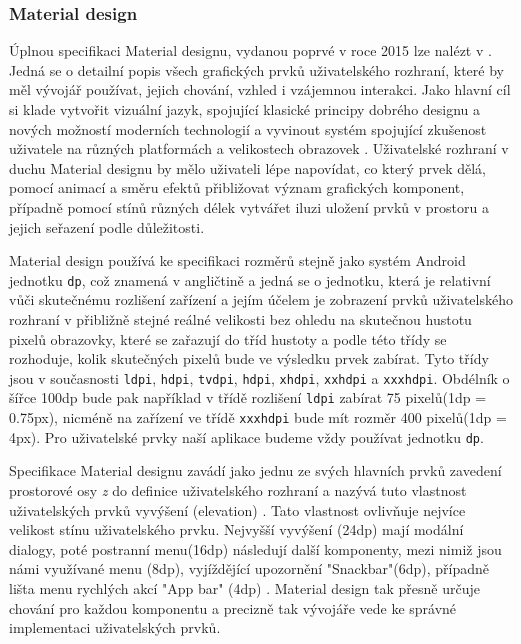 \documentclass[czech,master,public,dept460,male,java,cpdeclaration]{diploma}
\begin{document}
\subsubsection{Material design}
Úplnou specifikaci Material designu, vydanou poprvé v roce 2015 lze nalézt v \cite{materialdesign}.
Jedná se o detailní popis všech
grafických prvků uživatelského rozhraní, které by měl vývojář používat, jejich chování, vzhled i vzájemnou
 interakci. Jako hlavní cíl si klade vytvořit vizuální jazyk, spojující klasické principy dobrého designu
  a nových možností moderních technologií a vyvinout systém spojující zkušenost uživatele na různých
  platformách a velikostech obrazovek \cite{materialdesign}. Uživatelské rozhraní v duchu Material designu
  by mělo uživateli lépe napovídat, co který prvek dělá, pomocí animací a směru efektů přibližovat
  význam grafických komponent, případně pomocí stínů různých délek vytvářet iluzi uložení prvků
  v prostoru a jejich seřazení podle důležitosti.

  Material design používá ke specifikaci rozměrů
  stejně jako systém Android jednotku \texttt{dp}, což znamená v angličtině  a jedná se o jednotku, která je relativní vůči skutečnému rozlišení zařízení a jejím účelem
  je zobrazení prvků uživatelského rozhraní v přibližně stejné reálné velikosti bez ohledu na skutečnou
  hustotu pixelů obrazovky, které se zařazují do tříd hustoty a podle této třídy se rozhoduje,
  kolik skutečných pixelů bude ve výsledku prvek zabírat. Tyto třídy jsou v současnosti
  \texttt{ldpi}, \texttt{hdpi}, \texttt{tvdpi}, \texttt{hdpi}, \texttt{xhdpi}, \texttt{xxhdpi} a \texttt{xxxhdpi}.
  Obdélník o šířce 100dp bude pak například v třídě rozlišení \texttt{ldpi} zabírat 75 pixelů(1dp = 0.75px),
  nicméně na zařízení ve třídě \texttt{xxxhdpi} bude mít rozměr 400 pixelů(1dp = 4px). Pro uživatelské
  prvky naší aplikace budeme vždy používat jednotku \texttt{dp}.

  Specifikace Material designu zavádí jako jednu ze svých hlavních prvků zavedení prostorové osy \textit{z} do
  definice uživatelského rozhraní a nazývá tuto vlastnost uživatelských prvků vyvýšení (elevation) \cite{materialdesign}.
  Tato vlastnost ovlivňuje nejvíce velikost stínu uživatelského prvku. Nejvyšší vyvýšení (24dp)
  mají modální dialogy, poté postranní menu(16dp) následují další komponenty, mezi nimiž jsou námi využívané
  menu (8dp), vyjíždějící upozornění "Snackbar"(6dp), případně lišta menu rychlých akcí "App bar" (4dp) \cite{materialdesign}.
  Material design tak přesně určuje chování pro každou komponentu a precizně tak vývojáře vede ke správné
  implementaci uživatelských prvků.
\end{document}
